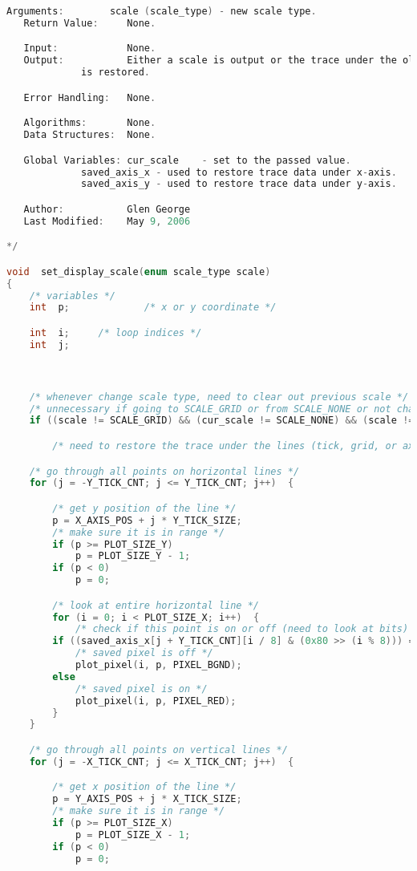 \begin{lstlisting}[language=C]
   Arguments:        scale (scale_type) - new scale type.
   Return Value:     None.

   Input:            None.
   Output:           Either a scale is output or the trace under the old scale
   		     is restored.

   Error Handling:   None.

   Algorithms:       None.
   Data Structures:  None.

   Global Variables: cur_scale    - set to the passed value.
   		     saved_axis_x - used to restore trace data under x-axis.
   		     saved_axis_y - used to restore trace data under y-axis.

   Author:           Glen George
   Last Modified:    May 9, 2006

*/

void  set_display_scale(enum scale_type scale)
{
    /* variables */
    int  p;             /* x or y coordinate */

    int  i;		/* loop indices */
    int  j;



    /* whenever change scale type, need to clear out previous scale */
    /* unnecessary if going to SCALE_GRID or from SCALE_NONE or not changing the scale */
    if ((scale != SCALE_GRID) && (cur_scale != SCALE_NONE) && (scale != cur_scale))  {

        /* need to restore the trace under the lines (tick, grid, or axis) */

	/* go through all points on horizontal lines */
	for (j = -Y_TICK_CNT; j <= Y_TICK_CNT; j++)  {

	    /* get y position of the line */
	    p = X_AXIS_POS + j * Y_TICK_SIZE;
	    /* make sure it is in range */
	    if (p >= PLOT_SIZE_Y)
	        p = PLOT_SIZE_Y - 1;
	    if (p < 0)
	        p = 0;

	    /* look at entire horizontal line */
	    for (i = 0; i < PLOT_SIZE_X; i++)  {
	        /* check if this point is on or off (need to look at bits) */
		if ((saved_axis_x[j + Y_TICK_CNT][i / 8] & (0x80 >> (i % 8))) == 0)
		    /* saved pixel is off */
		    plot_pixel(i, p, PIXEL_BGND);
		else
		    /* saved pixel is on */
		    plot_pixel(i, p, PIXEL_RED);
	    }
	}

	/* go through all points on vertical lines */
	for (j = -X_TICK_CNT; j <= X_TICK_CNT; j++)  {

	    /* get x position of the line */
	    p = Y_AXIS_POS + j * X_TICK_SIZE;
	    /* make sure it is in range */
	    if (p >= PLOT_SIZE_X)
	        p = PLOT_SIZE_X - 1;
	    if (p < 0)
	        p = 0;


\end{lstlisting}
